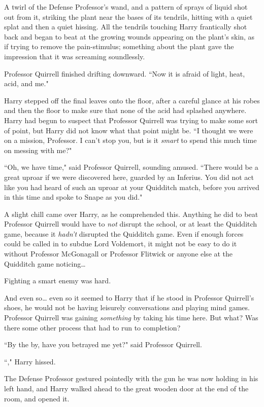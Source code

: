 A twirl of the Defense Professor's wand, and a pattern of sprays of liquid shot out from it, striking the plant near the bases of its tendrils, hitting with a quiet splat and then a quiet hissing. All the tendrils touching Harry frantically shot back and began to beat at the growing wounds appearing on the plant's skin, as if trying to remove the pain-stimulus; something about the plant gave the impression that it was screaming soundlessly.

Professor Quirrell finished drifting downward. ``Now it is afraid of light, heat, acid, and me."

Harry stepped off the final leaves onto the floor, after a careful glance at his robes and then the floor to make sure that none of the acid had splashed anywhere. Harry had begun to suspect that Professor Quirrell was trying to make some sort of point, but Harry did not know what that point might be. ``I thought we were on a mission, Professor. I can't stop you, but is it \emph{smart} to spend this much time on messing with me?"

``Oh, we have time," said Professor Quirrell, sounding amused. ``There would be a great uproar if we were discovered here, guarded by an Inferius. You did not act like you had heard of such an uproar at your Quidditch match, before you arrived in this time and spoke to Snape as you did."

A slight chill came over Harry, as he comprehended this. Anything he did to beat Professor Quirrell would have to \emph{not} disrupt the school, or at least the Quidditch game, because it \emph{hadn't} disrupted the Quidditch game. Even if enough forces could be called in to subdue Lord Voldemort, it might not be easy to do it without Professor McGonagall or Professor Flitwick or anyone else at the Quidditch game noticing{\ldots}

Fighting a smart enemy was hard.

And even so{\ldots} even so it seemed to Harry that if he stood in Professor Quirrell's shoes, he would not be having leisurely conversations and playing mind games. Professor Quirrell was gaining \emph{something} by taking his time here. But what? Was there some other process that had to run to completion?

``By the by, have you betrayed me yet?" said Professor Quirrell.

``," Harry hissed.

The Defense Professor gestured pointedly with the gun he was now holding in his left hand, and Harry walked ahead to the great wooden door at the end of the room, and opened it.

